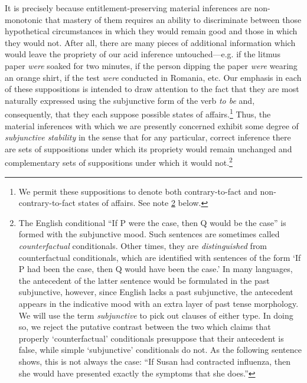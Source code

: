 \documentclass{svjour3}                     %
\begin{document}
It is precisely because entitlement-preserving material inferences are non-monotonic that mastery of them requires an ability to discriminate between those hypothetical circumstances in which they would remain good and those in which they would not.  After all, there are many pieces of additional information which would leave the propriety of our acid inference untouched---e.g. if the litmus paper \textit{were} soaked for two minutes, if the person dipping the paper \textit{were} wearing an orange shirt, if the test \textit{were} conducted in Romania, etc. Our emphasis in each of these suppositions is intended to draw attention to the fact that they are most naturally expressed using the subjunctive form of the verb \textit{to be} and, consequently, that they each suppose possible states of affairs.\footnote{We permit these suppositions to denote both contrary-to-fact and non-contrary-to-fact states of affairs. See note \ref{Grammar} below.} Thus, the material inferences with which we are presently concerned exhibit some degree of \textit{subjunctive stability} in the sense that for any particular, correct inference there are sets of suppositions under which its propriety would remain unchanged and complementary sets of suppositions under which it would not.\footnote{\label{Grammar}The English conditional ``If P were the case, then Q would be the case''  is formed with the subjunctive mood. Such sentences are sometimes called \textit{counterfactual} conditionals. Other times, they are \textit{distinguished} from counterfactual conditionals, which are identified with sentences of the form `If P had been the case, then Q would have been the case.' In many languages, the antecedent of the latter sentence would be formulated in the past subjunctive, however, since English lacks a past subjunctive, the antecedent appears in the indicative mood with an extra layer of past tense morphology. We will use the term \textit{subjunctive} to pick out clauses of either type. In doing so, we reject the putative contrast between the two which claims that properly `counterfactual' conditionals presuppose that their antecedent is false, while simple `subjunctive' conditionals do not. As the following sentence shows, this is not always the case: ``If Susan had contracted influenza, then she would have presented exactly the symptoms that she does.''}  
\end{document}
